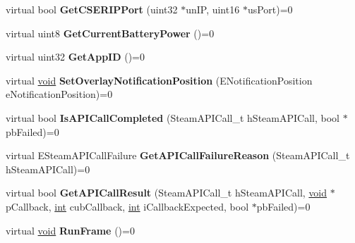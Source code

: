 \begin{DoxyCompactItemize}
\item 
\hypertarget{classISteamUtils_a448aef5550d6d1983404e09f4e81a72e}{}virtual bool {\bfseries Get\+C\+S\+E\+R\+I\+P\+Port} (uint32 $\ast$un\+I\+P, uint16 $\ast$us\+Port)=0\label{classISteamUtils_a448aef5550d6d1983404e09f4e81a72e}

\item 
\hypertarget{classISteamUtils_a1cee42b53209deb6ab735f612ef01f0c}{}virtual uint8 {\bfseries Get\+Current\+Battery\+Power} ()=0\label{classISteamUtils_a1cee42b53209deb6ab735f612ef01f0c}

\item 
\hypertarget{classISteamUtils_a6ab494a421d0220b196ced7cd3e0fbba}{}virtual uint32 {\bfseries Get\+App\+I\+D} ()=0\label{classISteamUtils_a6ab494a421d0220b196ced7cd3e0fbba}

\item 
\hypertarget{classISteamUtils_a1740a92ab814e9132ae06b5925408bd0}{}virtual \hyperlink{SDL__audio_8h_a52835ae37c4bb905b903cbaf5d04b05f}{void} {\bfseries Set\+Overlay\+Notification\+Position} (E\+Notification\+Position e\+Notification\+Position)=0\label{classISteamUtils_a1740a92ab814e9132ae06b5925408bd0}

\item 
\hypertarget{classISteamUtils_ab890ecbf78b1e84db17c51b5998680ca}{}virtual bool {\bfseries Is\+A\+P\+I\+Call\+Completed} (Steam\+A\+P\+I\+Call\+\_\+t h\+Steam\+A\+P\+I\+Call, bool $\ast$pb\+Failed)=0\label{classISteamUtils_ab890ecbf78b1e84db17c51b5998680ca}

\item 
\hypertarget{classISteamUtils_a40acce158f33543b3a0aa5d1deffcd21}{}virtual E\+Steam\+A\+P\+I\+Call\+Failure {\bfseries Get\+A\+P\+I\+Call\+Failure\+Reason} (Steam\+A\+P\+I\+Call\+\_\+t h\+Steam\+A\+P\+I\+Call)=0\label{classISteamUtils_a40acce158f33543b3a0aa5d1deffcd21}

\item 
\hypertarget{classISteamUtils_ab3449ee1977e394786075135f1d7617f}{}virtual bool {\bfseries Get\+A\+P\+I\+Call\+Result} (Steam\+A\+P\+I\+Call\+\_\+t h\+Steam\+A\+P\+I\+Call, \hyperlink{SDL__audio_8h_a52835ae37c4bb905b903cbaf5d04b05f}{void} $\ast$p\+Callback, \hyperlink{SDL__thread_8h_a6a64f9be4433e4de6e2f2f548cf3c08e}{int} cub\+Callback, \hyperlink{SDL__thread_8h_a6a64f9be4433e4de6e2f2f548cf3c08e}{int} i\+Callback\+Expected, bool $\ast$pb\+Failed)=0\label{classISteamUtils_ab3449ee1977e394786075135f1d7617f}

\item 
\hypertarget{classISteamUtils_a61c0b1e7982da51f4af5488eecb24f3b}{}virtual \hyperlink{SDL__audio_8h_a52835ae37c4bb905b903cbaf5d04b05f}{void} {\bfseries Run\+Frame} ()=0\label{classISteamUtils_a61c0b1e7982da51f4af5488eecb24f3b}


\end{DoxyCompactItemize}
